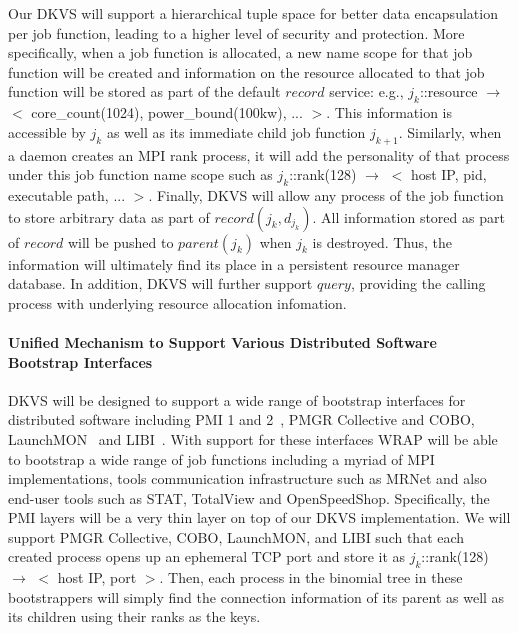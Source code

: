 Our DKVS will support a hierarchical tuple space for better
data encapsulation per job function, leading to a higher level of security and protection.
More specifically, when a job function is
allocated, a new name scope for that job function will be
created and information on the resource allocated
to that job function will be stored as part of the default $record$ service: e.g.,
$j_k$::resource $\rightarrow$ $<$ core\_count(1024), power\_bound(100kw), ... $>$.
This information is accessible by $j_k$ as well as
its immediate child job function $j_{k+1}$.
Similarly, when a daemon creates an MPI rank process, it will add the
personality of that process under this job function name scope
such as $j_k$::rank(128) $\rightarrow$ $<$ host IP, pid, executable path, ... $>$.
Finally, DKVS will allow any process of the job function to store arbitrary data
as part of $record(j_k, d_{j_k})$. All information stored
as part of $record$ will be pushed to $parent(j_k)$ when $j_k$
is destroyed. Thus, the information will ultimately find its place
in a persistent resource manager database. In addition,
DKVS will further support $query$, providing the calling process
with underlying resource allocation infomation.

\paragraph{Unified Mechanism to Support Various Distributed Software Bootstrap Interfaces}
\label{sect:bootstrap}

DKVS will be designed to support a wide range of bootstrap interfaces
for distributed software including PMI 1 and 2~\cite{PMI2}, PMGR Collective and COBO,
LaunchMON~\cite{launchmon} and LIBI~\cite{libi}. With support for these interfaces
WRAP will be able to bootstrap a wide range of job functions including a myriad of
MPI implementations, tools communication infrastructure such as MRNet
and also end-user tools such as STAT, TotalView and OpenSpeedShop.
Specifically, the PMI layers will be a very thin layer on top
of our DKVS implementation. We will support PMGR Collective,
COBO, LaunchMON, and LIBI such that each created process opens
up an ephemeral TCP port and store it as $j_k$::rank(128) $\rightarrow$ $<$ host IP, port $>$.
Then, each process in the binomial tree in these bootstrappers
will simply find the connection information of its parent as well as
its children using their ranks as the keys.

